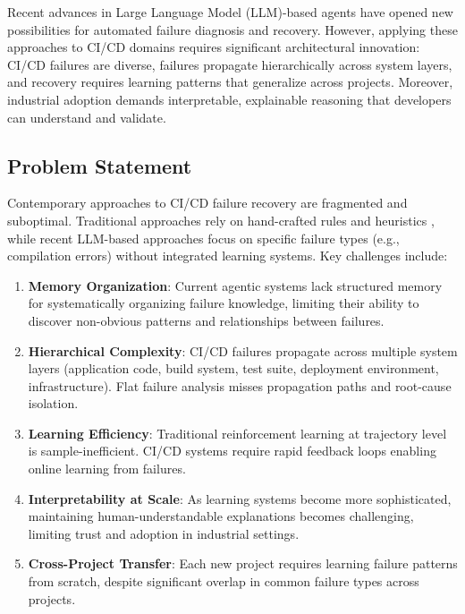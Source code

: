 \documentclass[11pt]{article}
\begin{document}
Recent advances in Large Language Model (LLM)-based agents have opened new possibilities for automated failure diagnosis and recovery. However, applying these approaches to CI/CD domains requires significant architectural innovation: CI/CD failures are diverse, failures propagate hierarchically across system layers, and recovery requires learning patterns that generalize across projects. Moreover, industrial adoption demands interpretable, explainable reasoning that developers can understand and validate.

\subsection{Problem Statement}

Contemporary approaches to CI/CD failure recovery are fragmented and suboptimal. Traditional approaches rely on hand-crafted rules and heuristics \citep{Fu2025}, while recent LLM-based approaches focus on specific failure types (e.g., compilation errors) without integrated learning systems. Key challenges include:

\begin{enumerate}
    \item \textbf{Memory Organization}: Current agentic systems lack structured memory for systematically organizing failure knowledge, limiting their ability to discover non-obvious patterns and relationships between failures.
    
    \item \textbf{Hierarchical Complexity}: CI/CD failures propagate across multiple system layers (application code, build system, test suite, deployment environment, infrastructure). Flat failure analysis misses propagation paths and root-cause isolation.
    
    \item \textbf{Learning Efficiency}: Traditional reinforcement learning at trajectory level is sample-inefficient. CI/CD systems require rapid feedback loops enabling online learning from failures.
    
    \item \textbf{Interpretability at Scale}: As learning systems become more sophisticated, maintaining human-understandable explanations becomes challenging, limiting trust and adoption in industrial settings.
    
    \item \textbf{Cross-Project Transfer}: Each new project requires learning failure patterns from scratch, despite significant overlap in common failure types across projects.
\end{enumerate}
\end{document}
